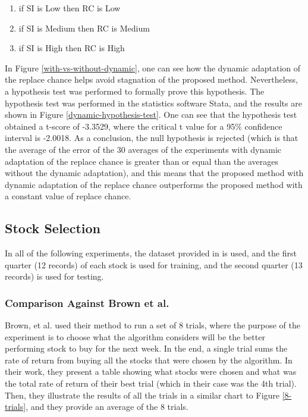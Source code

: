 \documentclass[a4paper,twoside]{article}
\begin{document}
\begin{enumerate}
\item if SI is Low then RC is Low
\item if SI is Medium then RC is Medium
\item if SI is High then RC is High
\end{enumerate}

In Figure \ref{with-vs-without-dynamic}, one can see how the dynamic adaptation of the replace chance helps avoid stagnation of the proposed method. Nevertheless, a hypothesis test was performed to formally prove this hypothesis. The hypothesis test was performed in the statistics software Stata, and the results are shown in Figure \ref{dynamic-hypothesis-test}. One can see that the hypothesis test obtained a t-score of -3.3529, where the critical t value for a 95\% confidence interval is -2.0018. As a conclusion, the null hypothesis is rejected (which is that the average of the error of the 30 averages of the experiments with dynamic adaptation of the replace chance is greater than or equal than the averages without the dynamic adaptation), and this means that the proposed method with dynamic adaptation of the replace chance outperforms the proposed method with a constant value of replace chance.

\subsection{Stock Selection}

In all of the following experiments, the dataset provided in \cite{brown2013dynamic} is used, and the first quarter (12 records) of each stock is used for training, and the second quarter (13 records) is used for testing.

\subsubsection{Comparison Against Brown et al.}

Brown, et al. \cite{brown2013dynamic} used their method to run a set of 8 trials, where the purpose of the experiment is to choose what the algorithm considers will be the better performing stock to buy for the next week. In the end, a single trial sums the rate of return from buying all the stocks that were chosen by the algorithm. In their work, they present a table showing what stocks were chosen and what was the total rate of return of their best trial (which in their case was the 4th trial). Then, they illustrate the results of all the trials in a similar chart to Figure \ref{8-trials}, and they provide an average of the 8 trials.
\end{document}
